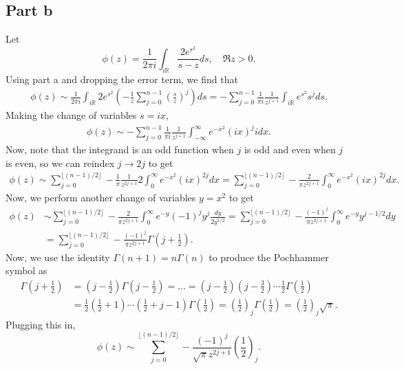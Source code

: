 \documentclass{article}
\begin{document}
\subsection{Part b}
Let 
\[
\phi(z) = \frac{1}{2\pi i} \int_{i \mathbb R} \frac{2e^{s^2}}{s-z} d s, \quad \Re z > 0.
\]
Using part a and dropping the error term, we find that 
\begin{align*}
\phi(z)\sim\frac{1}{2\pi i} \int_{i \mathbb R}2e^{s^2}\left(-\frac{1}{z}  \sum_{j=0}^{n-1} \left( \frac{s}{z} \right)^j\right)ds=-\sum_{j=0}^{n-1}\frac{1}{\pi i}\frac{1}{z^{j+1}}\int_{i \mathbb R}e^{s^2}s^jds.
\end{align*}
Making the change of variables $s=ix$,
\begin{align*}
\phi(z)\sim-\sum_{j=0}^{n-1}\frac{1}{\pi i}\frac{1}{z^{j+1}}\int_{-\infty}^\infty e^{-x^2}(ix)^jidx.
\end{align*}
Now, note that the integrand is an odd function when $j$ is odd and even when $j$ is even, so we can reindex $j\to2j$ to get
\begin{align*}
\phi(z)\sim\sum_{j=0}^{\lfloor(n-1)/2\rfloor}-\frac{1}{\pi }\frac{1}{z^{2j+1}}2\int_{0}^\infty e^{-x^2}(ix)^{2j}dx=\sum_{j=0}^{\lfloor(n-1)/2\rfloor}-\frac{2}{\pi z^{2j+1}}\int_{0}^\infty e^{-x^2}(ix)^{2j}dx.
\end{align*}
Now, we perform another change of variables $y=x^2$ to get
\begin{align*}
\phi(z)&\sim\sum_{j=0}^{\lfloor(n-1)/2\rfloor}-\frac{2}{\pi z^{2j+1}}\int_{0}^\infty e^{-y}(-1)^jy^j\frac{dy}{2y^{1/2}}=\sum_{j=0}^{\lfloor(n-1)/2\rfloor}-\frac{(-1)^j}{\pi z^{2j+1}}\int_{0}^\infty e^{-y}y^{j-1/2}dy\\&=
\sum_{j=0}^{\lfloor(n-1)/2\rfloor}-\frac{(-1)^j}{\pi z^{2j+1}}\Gamma\left(j+\frac{1}{2}\right).
\end{align*}
Now, we use the identity $\Gamma(n+1)=n\Gamma(n)$ to produce the Pochhammer symbol as
\begin{align*}
\Gamma\left(j+\frac{1}{2}\right)&=\left(j-\frac{1}{2}\right)\Gamma\left(j-\frac{1}{2}\right)=\ldots=\left(j-\frac{1}{2}\right)\left(j-\frac{3}{2}\right)\cdots\frac{1}{2}\Gamma\left(\frac{1}{2}\right)\\&=
\frac{1}{2}\left(\frac{1}{2}+1\right)\cdots\left(\frac{1}{2}+j-1\right)\Gamma\left(\frac{1}{2}\right)=\left(\frac{1}{2}\right)_j\Gamma\left(\frac{1}{2}\right)=\left(\frac{1}{2}\right)_j\sqrt{\pi}.
\end{align*}
Plugging this in,
\[
\phi(z)\sim\sum_{j=0}^{\lfloor(n-1)/2\rfloor}-\frac{(-1)^j}{\sqrt{\pi} z^{2j+1}}\left(\frac{1}{2}\right)_j.
\]
\end{document}
